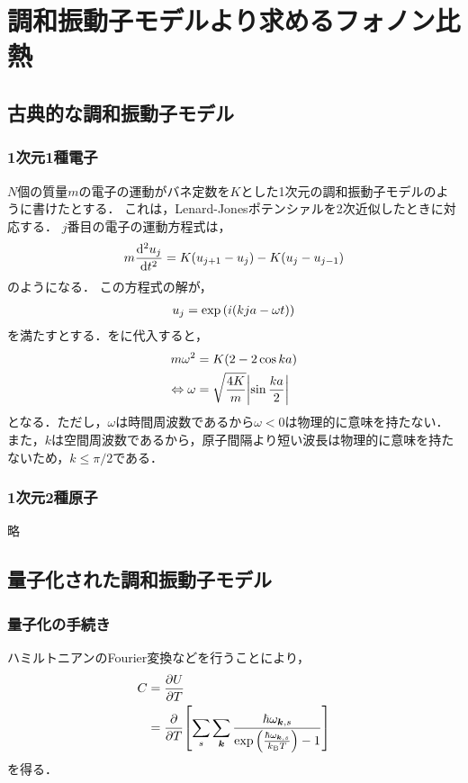 \documentclass{report}
\begin{document}
  \maketitle
  \tableofcontents
  \chapter{調和振動子モデルより求めるフォノン比熱}
    \section{古典的な調和振動子モデル}
      \subsection{1次元1種電子}
          $N$個の質量$m$の電子の運動がバネ定数を$K$とした1次元の調和振動子モデルのように書けたとする．
          これは，Lenard-Jonesポテンシァルを2次近似したときに対応する．
          $j$番目の電子の運動方程式は，
          \begin{align}
            m \dv[2]{u_j}{t} = K(u_{j + 1} - u_j) - K(u_j - u_{j - 1}) \label{1d-1electron-newton-eq}
          \end{align}
          のようになる．
          この方程式の解が，
          \begin{align}
            u_j = \exp\qty(i(kja - \omega t)) \label{1d-solution}
          \end{align}
          を満たすとする．をに代入すると，
          \begin{align}
            m\omega^2 &= K(2 - 2\cos ka) \\ 
            \Leftrightarrow \omega &= \sqrt{\frac{4K}{m}}\abs{\sin \frac{ka}{2}} \label{1d-dispersion-relation}
          \end{align}
          となる．ただし，$\omega$は時間周波数であるから$\omega < 0$は物理的に意味を持たない．
          また，$k$は空間周波数であるから，原子間隔より短い波長は物理的に意味を持たないため，$k \leq \pi/2$である．
      \subsection{1次元2種原子}
        略
    \section{量子化された調和振動子モデル}
      \subsection{量子化の手続き}
        ハミルトニアンのFourier変換などを行うことにより，
        \begin{align}
          C &= \pdv{U}{T} \\ 
          &= \pdv{T}\qty[\sum_s\sum_{\bm{k}}\frac{\hbar\omega_{\bm{k}, s}}{\exp\qty(\frac{\hbar\omega_{\bm{k}, s}}{k_{\mathrm{B}} T}) - 1}] \label{phonon-c}
        \end{align}
        を得る．
\end{document}
